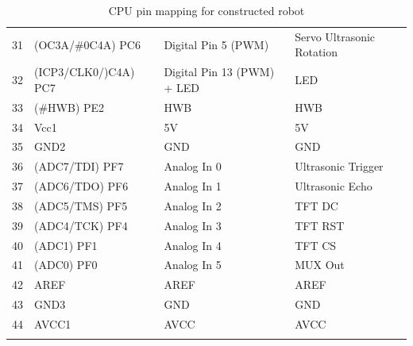 \documentclass[11pt,a4paper]{article}
\begin{document}
\begin{longtable}{p{}p{}p{}p{}}
31&(OC3A/\#0C4A) PC6&Digital Pin 5 (PWM)&Servo Ultrasonic Rotation\\
32&(ICP3/CLK0/)C4A) PC7&Digital Pin 13 (PWM) + LED&LED\\
33&(\#HWB) PE2&HWB&HWB\\
34&Vcc1&5V&5V\\
35&GND2&GND&GND\\
36&(ADC7/TDI) PF7&Analog In 0&Ultrasonic Trigger\\
37&(ADC6/TDO) PF6&Analog In 1&Ultrasonic Echo\\
38&(ADC5/TMS) PF5&Analog In 2&TFT DC\\
39&(ADC4/TCK) PF4&Analog In 3&TFT RST\\
40&(ADC1) PF1&Analog In 4&TFT CS\\
41&(ADC0) PF0&Analog In 5&MUX Out\\
42&AREF&AREF&AREF\\
43&GND3&GND&GND\\
44&AVCC1&AVCC&AVCC\\
\bottomrule
\caption{CPU pin mapping for constructed robot}

\end{longtable}
\end{document}
